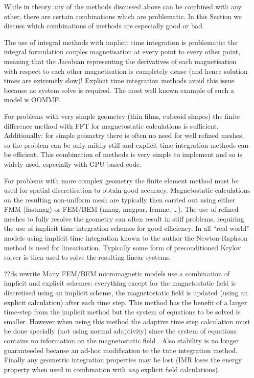 While in theory any of the methods discussed above can be combined with any other, there are certain combinations which are problematic.
In this Section we discuss which combinations of methods are especially good or bad.

The use of integral methods with implicit time integration is problematic: the integral formulation couples magnetisation at every point to every other point, meaning that the Jacobian representing the derivatives of each magnetisation with respect to each other magnetisation is completely dense (and hence solution times are extremely slow)!
Explicit time integration methods avoid this issue because no system solve is required.
The most well known example of such a model is OOMMF.


For problems with very simple geometry (\ie thin films, cubeoid shapes) the finite difference method with FFT for magnetostatic calculations is sufficient.
Additionally: for simple geometry there is often no need for well refined meshes, so the problem can be only mildly stiff and explicit time integration methods can be efficient.
This combination of methods is very simple to implement and so is widely used, especially with GPU based code.

For problems with more complex geometry the finite element method must be used for spatial discretisation to obtain good accuracy. 
Magnetostatic calculations on the resulting non-uniform mesh are typically then carried out using either FMM (fastmag) or FEM/BEM (nmag, magpar, femme, \ldots).
The use of refined meshes to fully resolve the geometry can often result in stiff problems, requiring the use of implicit time integration schemes for good efficiency.
In all ``real world'' models using implicit time integration known to the author the Newton-Raphson method is used for linearisation.
Typically some form of preconditioned Krylov solver is then used to solve the resulting linear systems.

??ds rewrite
Many FEM/BEM micromagnetic models use a combination of implicit and explicit schemes: everything except for the magnetostatic field is discretised using an implicit scheme, the magnetostatic field is updated (using an explicit calculation) after each time step. 
This method has the benefit of a larger time-step from the implicit method but the system of equations to be solved is smaller.
However when using this method the adaptive time step calculation must be done specially (\ie not using normal adaptivity) since the system of equations contains no information on the magnetostatic field \cite{Schrefl1997}.
Also stability is no longer guaranteeded because an ad-hoc modification to the time integration method.
Finally any geometric integration properties may be lost (\eg IMR loses the energy property when used in combination with \emph{any} explicit field calculations). 

